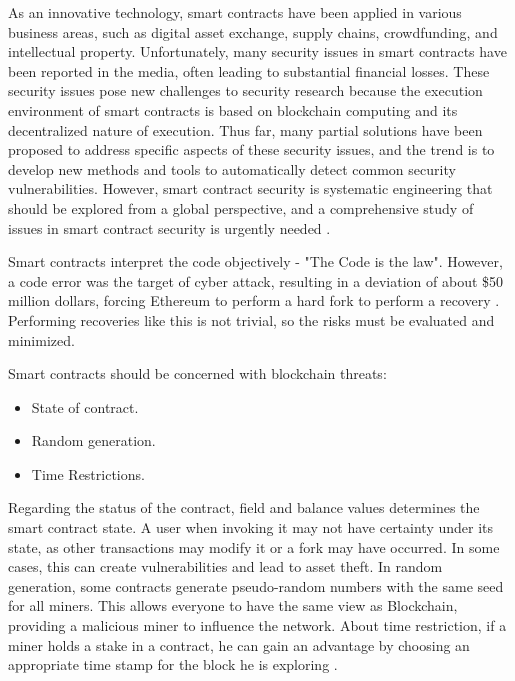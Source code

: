 As an innovative technology, smart contracts have been applied in various business areas, such as digital asset exchange, supply chains, crowdfunding, and intellectual property. Unfortunately, many security issues in smart contracts have been reported in the media, often leading to substantial financial losses. These security issues pose new challenges to security research because the execution environment of smart contracts is based on blockchain computing and its decentralized nature of execution. Thus far, many partial solutions have been proposed to address specific aspects of these security issues, and the trend is to develop new methods and tools to automatically detect common security vulnerabilities. However, smart contract security is systematic engineering that should be explored from a global perspective, and a comprehensive study of issues in smart contract security is urgently needed \cite{huang2019smart}.

Smart contracts interpret the code objectively - "The Code is the law". However, a code error was the target of cyber attack, resulting in a deviation of about \$50 million dollars, forcing Ethereum to perform a hard fork to perform a recovery \cite{bashir2018mastering}. Performing recoveries like this is not trivial, so the risks must be evaluated and minimized.

Smart contracts should be concerned with blockchain threats:
\begin{itemize}
\item State of contract.
\item Random generation.
\item Time Restrictions.
\end{itemize}

Regarding the status of the contract, field and balance values determines the smart contract state. A user when invoking it may not have certainty under its state, as other transactions may modify it or a fork may have occurred. In some cases, this can create vulnerabilities and lead to asset theft. In random generation, some contracts generate pseudo-random numbers with the same seed for all miners. This allows everyone to have the same view as Blockchain, providing
a malicious miner to influence the network. About time restriction, if a miner holds a stake in a contract, he can gain an advantage by choosing an appropriate time stamp for the block he is exploring \cite{greve2018blockchain}.